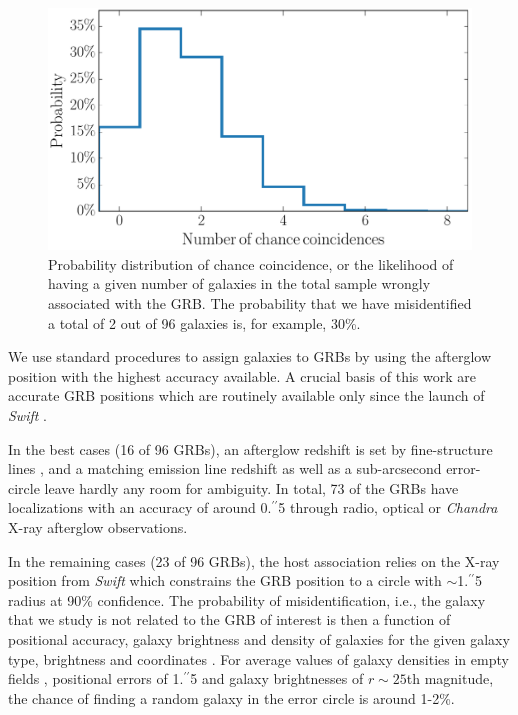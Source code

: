 \documentclass[traditabstract, longauth]{aa}
\newcommand{\farc}{\hbox{$.\!\!^{\prime\prime}$}}
\begin{document}
\begin{figure}
\includegraphics[angle=0, width=0.99\columnwidth]{Figs/Misidentifications.pdf}
\caption{Probability distribution of chance coincidence, or the likelihood of having a given number of galaxies in the total sample wrongly associated with the GRB. The probability that we have misidentified a total of 2 out of 96 galaxies is, for example, 30\%.}
\label{fig:misid}
\end{figure}

We use standard procedures \citep{2002AJ....123.1111B, 2009AJ....138.1690P} to assign galaxies to GRBs by using the afterglow position with the highest accuracy available. A crucial basis of this work are accurate GRB positions which are routinely available only since the launch of \textit{Swift} \citep{2004ApJ...611.1005G, 2005SSRv..120..165B}. 

In the best cases  {(16 of 96 GRBs)}, an afterglow redshift is set by fine-structure lines \citep[e.g.,][]{2007A&A...468...83V}, and a matching emission line redshift as well as a sub-arcsecond error-circle leave hardly any room for ambiguity.  {In total, 73 of the GRBs have localizations with an accuracy of around 0\farc{5} through radio, optical or \textit{Chandra} X-ray afterglow observations.}

In the remaining cases  {(23 of 96 GRBs)}, the host association relies on the X-ray position from \textit{Swift} which constrains the GRB position to a circle with $\sim$1\farc{5} radius at 90\% confidence. The probability of misidentification, i.e., the galaxy that we study is not related to the GRB of interest is then a function of positional accuracy, galaxy brightness and density of galaxies for the given galaxy type, brightness and coordinates \citep[e.g.,][]{2014A&A...572A..47R}. For average values of galaxy densities in empty fields \citep{2004AJ....127..180C, 2006ApJS..162....1G}, positional errors of 1\farc{5} and galaxy brightnesses of $r\sim25$th magnitude, the chance of finding a random galaxy in the error circle is around 1-2\%. 
\end{document}
